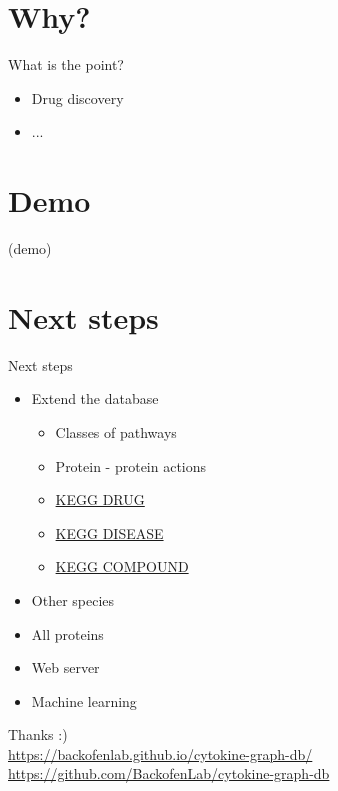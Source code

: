 \documentclass{beamer}
\begin{document}
\section{Why?}

\begin{frame}{What is the point?}
\begin{itemize}
    \item Drug discovery
    \item ...
\end{itemize}
\end{frame}

\section{Demo}
\begin{frame}
\centering
\huge{(demo)}
\end{frame}

\section{Next steps}
\begin{frame}{Next steps}
\begin{itemize}
    \item Extend the database
    \begin{itemize}
        \item Classes of pathways
        \item Protein - protein actions
        \item \href{https://www.genome.jp/kegg/drug/}{KEGG DRUG}
        \item \href{https://www.genome.jp/kegg/disease/}{KEGG DISEASE}
        \item \href{https://www.genome.jp/kegg/compound/}{KEGG COMPOUND}
    \end{itemize}
    \item Other species
    \item All proteins
    \item Web server
    \item Machine learning
\end{itemize}
\end{frame}

\begin{frame}
\centering
\huge{Thanks :)}
\bigskip \\
\small{
    \href{https://backofenlab.github.io/cytokine-graph-db/}{https://backofenlab.github.io/cytokine-graph-db/} \\
    \href{https://github.com/BackofenLab/cytokine-graph-db}{https://github.com/BackofenLab/cytokine-graph-db}
}
\end{frame}
\end{document}
